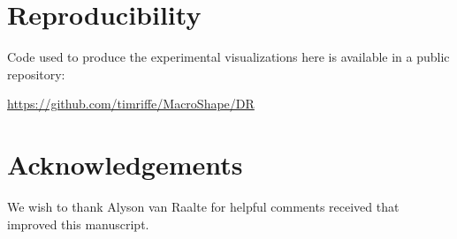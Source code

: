 \documentclass{article}
\newlength{\blackoutwidth}
\newcommand{\blackout}[1]
{%
  \settowidth{\blackoutwidth}{#1}%
  \rule[-0.3em]{\blackoutwidth}{1.125em}%
}
\begin{document}
\section{Reproducibility}
Code used to produce the experimental visualizations here is available in a public repository: 

\url{https://github.com/timriffe/MacroShape/DR}

\section{Acknowledgements}
We wish to thank Alyson van Raalte for helpful comments received that improved this manuscript.

\FloatBarrier
\singlespacing

   
\end{document}
